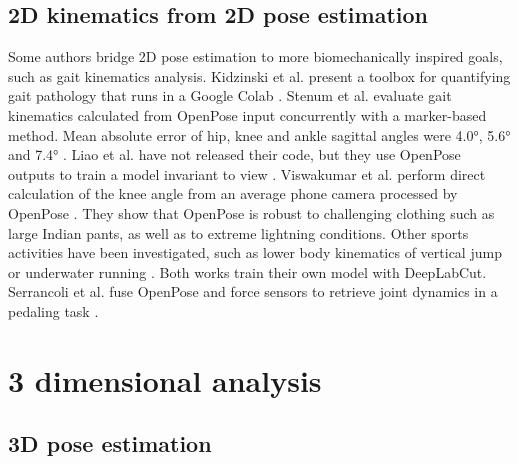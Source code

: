 \subsection{2D kinematics from 2D pose estimation}

Some authors bridge 2D pose estimation to more biomechanically inspired goals, such as gait kinematics analysis. Kidzinski et al. present a toolbox for quantifying gait pathology that runs in a Google Colab \cite{Kidziński2020}. Stenum et al. evaluate gait kinematics calculated from OpenPose input concurrently with a marker-based method. Mean absolute error of hip, knee and ankle sagittal angles were 4.0°, 5.6° and 7.4° \cite{Stenum2021}. Liao et al. have not released their code, but they use OpenPose outputs to train a model invariant to view \cite{Liao2020}. Viswakumar et al. perform direct calculation of the knee angle from an average phone camera processed by OpenPose \cite{Viswakumar2019}. They show that OpenPose is robust to challenging clothing such as large Indian pants, as well as to extreme lightning conditions. Other sports activities have been investigated, such as lower body kinematics of vertical jump \cite{Drazan2021} or underwater running \cite{Cronin2019}. Both works train their own model with DeepLabCut. Serrancoli et al. fuse OpenPose and force sensors to retrieve joint dynamics in a pedaling task \cite{Serrancolí2020}. 


\section{3 dimensional analysis} 

\FloatBarrier
\subsection{3D pose estimation}

